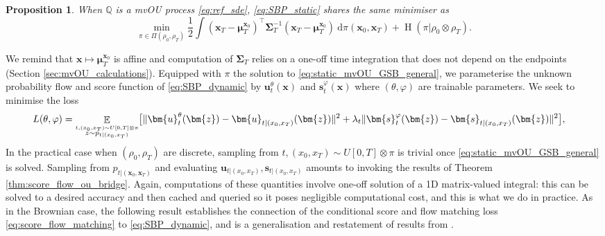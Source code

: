 \documentclass{article}
\newcommand{\Ent}{\operatorname{H}}
\newcommand{\diff}{\mathrm{d}}
\newcommand{\E}{\mathbb{E}}
\theoremstyle{newstyle}
\newtheorem{prop}{Proposition}
\begin{document}
\begin{prop}
  \label{prop:SBP_static_mvOU}
  When $\mathbb{Q}$ is a mvOU process \eqref{eq:ref_sde}, \eqref{eq:SBP_static} shares the same minimiser as 
  \begin{equation}
    \min_{\pi \in \Pi(\rho_0, \rho_T)} \textstyle\frac{1}{2} \int (\bm{x}_T - \bm{\mu}_T^{\bm{x}_0})^\top \bm{\Sigma}_T^{-1} (\bm{x}_T - \bm{\mu}_T^{\bm{x}_0}) \: \diff \pi(\bm{x}_0, \bm{x}_T) + \Ent(\pi | \rho_0 \otimes \rho_T). \label{eq:static_mvOU_GSB_general}
  \end{equation}
\end{prop}
\vspace{-0.5em}
We remind that $\bm{x} \mapsto \bm{\mu}_T^{\bm{x}_0}$ is affine and computation of $\bm{\Sigma}_T$ relies on a one-off time integration that does not depend on the endpoints (Section \ref{sec:mvOU_calculations}). Equipped with $\pi$ the solution to \eqref{eq:static_mvOU_GSB_general}, we parameterise the unknown probability flow and score function of \eqref{eq:SBP_dynamic} by $\bm{u}^\theta_t(\bm{x})$ and $\bm{s}^\varphi_t(\bm{x})$ where $(\theta, \varphi)$ are trainable parameters. We seek to minimise the loss
\begin{equation}
  \hspace{-1em} L(\theta, \varphi) = \mathop{\E}_{\mathrel{\stackrel{t, (x_0, x_T) \sim U[0, T] \otimes \pi}{z \sim p_{t | (x_0, x_T)}}}} \bigl[ \| \bm{u}^\theta_t(\bm{z}) - \bm{u}_{t | (x_0, x_T)}(\bm{z}) \|^2 + \lambda_t \| \bm{s}^\varphi_t(\bm{z}) - \bm{s}_{t | (x_0, x_T)}(\bm{z}) \|^2 \bigr],  \label{eq:score_flow_matching}
\end{equation}
In the practical case when $(\rho_0, \rho_T)$ are discrete, sampling from $t, (x_0, x_T) \sim U[0, T] \otimes \pi$ is trivial once \eqref{eq:static_mvOU_GSB_general} is solved. Sampling from $p_{t | (\bm{x}_0, \bm{x}_T)}$ and evaluating $\bm{u}_{t | (x_0, x_T)}, \bm{s}_{t | (x_0, x_T)}$ amounts to invoking the results of Theorem \ref{thm:score_flow_ou_bridge}. Again, computations of these quantities involve one-off solution of a 1D matrix-valued integral: this can be solved to a desired accuracy and then cached and queried so it poses negligible computational cost, and this is what we do in practice. As in the Brownian case, the following result establishes the connection of the conditional score and flow matching loss \eqref{eq:score_flow_matching} to \eqref{eq:SBP_dynamic}, and is a generalisation and restatement of results from \cite[Theorem 3.2, Proposition 3.4]{tong2023simulation}. 
\end{document}
